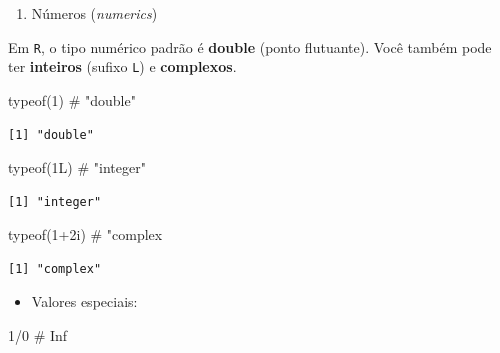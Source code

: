 \documentclass[
  letterpaper,
  DIV=11,
  numbers=noendperiod]{scrreprt}
\newenvironment{Shaded}{\begin{snugshade}}{\end{snugshade}}
\newcommand{\CommentTok}[1]{\textcolor[rgb]{0.37,0.37,0.37}{#1}}
\newcommand{\DecValTok}[1]{\textcolor[rgb]{0.68,0.00,0.00}{#1}}
\newcommand{\FunctionTok}[1]{\textcolor[rgb]{0.28,0.35,0.67}{#1}}
\newcommand{\NormalTok}[1]{\textcolor[rgb]{0.00,0.23,0.31}{#1}}
\newcommand{\SpecialCharTok}[1]{\textcolor[rgb]{0.37,0.37,0.37}{#1}}
\providecommand{\tightlist}{%
  \setlength{\itemsep}{0pt}\setlength{\parskip}{0pt}}\usepackage{longtable,booktabs,array}
\begin{document}
\begin{enumerate}
\def\labelenumi{\arabic{enumi})}
\tightlist
\item
  Números (\emph{numerics})
\end{enumerate}

Em \texttt{R}, o tipo numérico padrão é \textbf{double} (ponto
flutuante). Você também pode ter \textbf{inteiros} (sufixo \texttt{L}) e
\textbf{complexos}.

\begin{Shaded}
\begin{Highlighting}[]
\FunctionTok{typeof}\NormalTok{(}\DecValTok{1}\NormalTok{)      }\CommentTok{\# "double"}
\end{Highlighting}
\end{Shaded}

\begin{verbatim}
[1] "double"
\end{verbatim}

\begin{Shaded}
\begin{Highlighting}[]
\FunctionTok{typeof}\NormalTok{(}\DecValTok{1}\NormalTok{L)     }\CommentTok{\# "integer"}
\end{Highlighting}
\end{Shaded}

\begin{verbatim}
[1] "integer"
\end{verbatim}

\begin{Shaded}
\begin{Highlighting}[]
\FunctionTok{typeof}\NormalTok{(}\DecValTok{1}\SpecialCharTok{+}\DecValTok{2}\NormalTok{i)   }\CommentTok{\# "complex}
\end{Highlighting}
\end{Shaded}

\begin{verbatim}
[1] "complex"
\end{verbatim}

\begin{itemize}
\tightlist
\item
  Valores especiais:
\end{itemize}

\begin{Shaded}
\begin{Highlighting}[]
\DecValTok{1}\SpecialCharTok{/}\DecValTok{0}  \CommentTok{\# Inf}
\end{Highlighting}
\end{Shaded}
\end{document}
